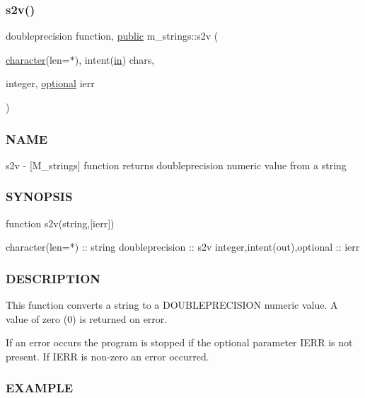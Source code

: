 \subsubsection{\texorpdfstring{s2v()}{s2v()}}
{\footnotesize\ttfamily doubleprecision function, \hyperlink{M__stopwatch_83_8txt_a2f74811300c361e53b430611a7d1769f}{public} m\+\_\+strings\+::s2v (\begin{DoxyParamCaption}\item[{\hyperlink{option__stopwatch_83_8txt_abd4b21fbbd175834027b5224bfe97e66}{character}(len=$\ast$), intent(\hyperlink{M__journal_83_8txt_afce72651d1eed785a2132bee863b2f38}{in})}]{chars,  }\item[{integer, \hyperlink{option__stopwatch_83_8txt_aa4ece75e7acf58a4843f70fe18c3ade5}{optional}}]{ierr }\end{DoxyParamCaption})}



\subsubsection*{N\+A\+ME}

s2v -\/ \mbox{[}M\+\_\+strings\mbox{]} function returns doubleprecision numeric value from a string 

\subsubsection*{S\+Y\+N\+O\+P\+S\+IS}

\begin{DoxyVerb}function s2v(string,[ierr])

 character(len=*)             :: string
 doubleprecision              :: s2v
 integer,intent(out),optional :: ierr
\end{DoxyVerb}


\subsubsection*{D\+E\+S\+C\+R\+I\+P\+T\+I\+ON}

This function converts a string to a D\+O\+U\+B\+L\+E\+P\+R\+E\+C\+I\+S\+I\+ON numeric value. A value of zero (0) is returned on error.

If an error occurs the program is stopped if the optional parameter I\+E\+RR is not present. If I\+E\+RR is non-\/zero an error occurred.

\subsubsection*{E\+X\+A\+M\+P\+LE}

